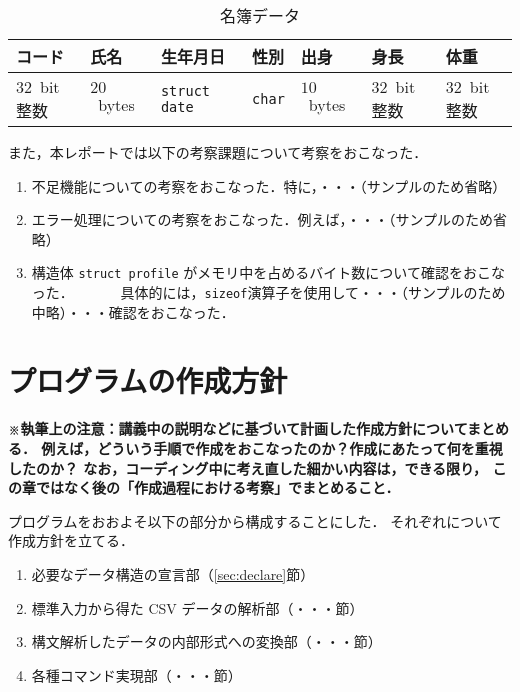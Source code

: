 \documentclass[a4j,11pt]{jarticle}
\begin{document}
\begin{table}[t]
\centering %
    \caption{名簿データ}
    \label{tbl:structure_person}
    \begin{tabular}{|l|l|l|l|l|l|l|}
        \hline
        コード & 氏名 & 生年月日 & 性別 & 出身 & 身長 & 体重\\
        \hline
        $32$~bit整数 & $20$~bytes & \verb|struct date|
        & \verb|char| & $10$~bytes & $32$~bit整数 & $32$~bit整数\\
        \hline
    \end{tabular}
\end{table}

また，本レポートでは以下の考察課題について考察をおこなった．

\begin{enumerate}
\setlength{\parskip}{2pt}\setlength{\itemsep}{2pt}%
    \item 不足機能についての考察をおこなった．特に，・・・（サンプルのため省略）
    \item エラー処理についての考察をおこなった．例えば，・・・（サンプルのため省略）
    \item 構造体 \verb|struct profile| がメモリ中を占めるバイト数について確認をおこなった．
       　　　具体的には，\verb|sizeof|演算子を使用して・・・（サンプルのため中略）・・・確認をおこなった．
\end{enumerate}

\section{プログラムの作成方針}

\textbf{\small ※執筆上の注意：講義中の説明などに基づいて計画した作成方針についてまとめる．
    例えば，どういう手順で作成をおこなったのか？作成にあたって何を重視したのか？
    なお，コーディング中に考え直した細かい内容は，できる限り，
    この章ではなく後の「作成過程における考察」でまとめること．\\}

プログラムをおおよそ以下の部分から構成することにした．
それぞれについて作成方針を立てる．

\begin{enumerate}
\setlength{\parskip}{2pt} \setlength{\itemsep}{2pt}
    \item 必要なデータ構造の宣言部（\ref{sec:declare}節）
    \item 標準入力から得た CSV データの解析部（・・・節）
    \item 構文解析したデータの内部形式への変換部（・・・節）
    \item 各種コマンド実現部（・・・節）
\end{enumerate}
\end{document}
